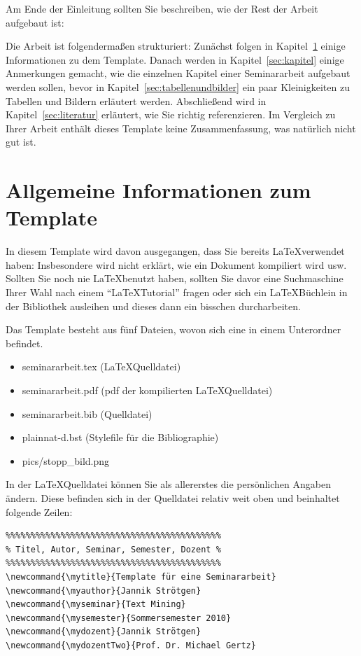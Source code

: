 \documentclass[
     11pt,         %
     a4paper,      %
     oneside,
     ]{article}
\newcommand{\mytitle}{Template für eine Seminararbeit}
\newcommand{\myauthor}{Jannik Strötgen}
\newcommand{\myseminar}{Text Mining}
\newcommand{\mysemester}{Sommersemester 2010}
\newcommand{\mydozent}{Jannik Strötgen}
\newcommand{\mydozentTwo}{Prof. Dr. Michael Gertz}
\begin{document}
Am Ende der Einleitung sollten Sie beschreiben, wie der Rest der Arbeit aufgebaut ist:

Die Arbeit ist folgendermaßen strukturiert: Zunächst folgen in Kapitel~\ref{sec:template} einige Informationen zu dem Template.
Danach werden in Kapitel~\ref{sec:kapitel} einige Anmerkungen gemacht, wie die einzelnen Kapitel einer Seminararbeit aufgebaut werden sollen, bevor in Kapitel~\ref{sec:tabellenundbilder} ein paar Kleinigkeiten zu Tabellen und Bildern erläutert werden. 
Abschließend wird in Kapitel~\ref{sec:literatur} erläutert, wie Sie richtig referenzieren.
Im Vergleich zu Ihrer Arbeit enthält dieses Template keine Zusammenfassung, was natürlich nicht gut ist.

\section{Allgemeine Informationen zum Template}\label{sec:template}
In diesem Template wird davon ausgegangen, dass Sie bereits \LaTeX verwendet haben: Insbesondere wird nicht erklärt, wie ein Dokument kompiliert wird usw. Sollten Sie noch nie \LaTeX benutzt haben, sollten Sie davor eine Suchmaschine Ihrer Wahl nach einem ``\LaTeX Tutorial'' fragen oder sich ein \LaTeX Büchlein in der Bibliothek ausleihen und dieses dann ein bisschen durcharbeiten.

Das Template besteht aus fünf Dateien, wovon sich eine in einem Unterordner befindet.
\begin{itemize}
\item seminararbeit.tex (\LaTeX Quelldatei)
\item seminararbeit.pdf (pdf der kompilierten \LaTeX Quelldatei)
\item seminararbeit.bib (\BibTeX Quelldatei)
\item plainnat-d.bst (Stylefile für die Bibliographie)
\item pics/stopp\_bild.png
\end{itemize}

In der \LaTeX Quelldatei können Sie als allererstes die persönlichen Angaben ändern. Diese befinden sich in der Quelldatei relativ weit oben und beinhaltet folgende Zeilen:

\begin{verbatim}
%%%%%%%%%%%%%%%%%%%%%%%%%%%%%%%%%%%%%%%%%%%
% Titel, Autor, Seminar, Semester, Dozent %
%%%%%%%%%%%%%%%%%%%%%%%%%%%%%%%%%%%%%%%%%%%
\newcommand{\mytitle}{Template für eine Seminararbeit}
\newcommand{\myauthor}{Jannik Strötgen}
\newcommand{\myseminar}{Text Mining}
\newcommand{\mysemester}{Sommersemester 2010}
\newcommand{\mydozent}{Jannik Strötgen}
\newcommand{\mydozentTwo}{Prof. Dr. Michael Gertz}
\end{verbatim}
\end{document}
